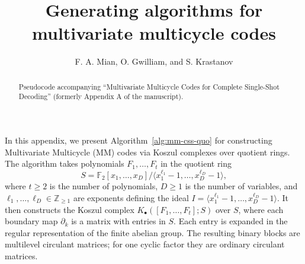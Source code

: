 \documentclass[%
 reprint,
 superscriptaddress, 
 amsmath,amssymb,
 aps,
 pra,
 floatfix,
]{revtex4-2}
\theoremstyle{definition}
\theoremstyle{definition}
\begin{document}
\title{Generating algorithms for multivariate multicycle codes}
\author{F. A. Mian, O. Gwilliam, and S. Krastanov}
\begin{abstract}Pseudocode accompanying ``Multivariate Multicycle Codes for Complete Single-Shot Decoding'' (formerly Appendix A of the manuscript).\end{abstract}
\maketitle

In this appendix, we present Algorithm~\ref{alg:mm-css-quo} for constructing Multivariate Multicycle (MM) codes via Koszul complexes over quotient rings. The algorithm takes polynomials $F_1, \ldots, F_t$ in the quotient ring 
\begin{equation}
S = \mathbb{F}_2[x_1, \ldots, x_D] / \langle x_1^{\ell_1} - 1, \ldots, x_D^{\ell_D} - 1 \rangle,
\end{equation}
where $t \geq 2$ is the number of polynomials, {$D \geq 1$} is the number of variables, and $\ell_1, \ldots, \ell_D \in \mathbb{Z}_{\geq 1}$ are exponents defining the ideal $I = \langle x_1^{\ell_1} - 1, \ldots, x_D^{\ell_D} - 1 \rangle$. It then constructs the Koszul complex $K_\bullet([F_1, \ldots, F_t]; S)$ over $S$, where each boundary map $\partial_k$ is a matrix with entries in $S$. {Each entry is expanded in the regular representation of the finite abelian group. The resulting binary blocks are multilevel circulant matrices; for one cyclic factor they are ordinary circulant matrices.}
\end{document}
